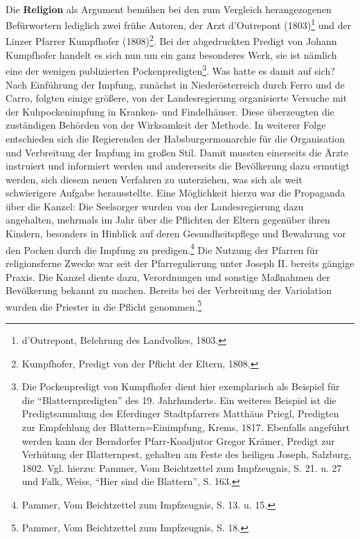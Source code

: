 \documentclass[
    a4paper,
    12pt,
    hyphens,
    chapterprefix=true,
    headheight=33pt,
    footheight=29pt,
    headings=optiontohead,
]{scrartcl}
\begin{document}
{\\
Die \textbf{Religion} als Argument bemühen bei den zum Vergleich herangezogenen Befürwortern lediglich zwei frühe Autoren, der Arzt d'Outrepont (1803)\footnote{d'Outrepont, Belehrung des Landvolkes, 1803.} und der Linzer Pfarrer Kumpfhofer (1808)\footnote{Kumpfhofer, Predigt von der Pflicht der Eltern, 1808.}. Bei der abgedruckten Predigt von Johann Kumpfhofer handelt es sich nun um ein ganz besonderes Werk, sie ist nämlich eine der wenigen publizierten Pockenpredigten\footnote{Die Pockenpredigt von Kumpfhofer dient hier exemplarisch als Beispiel für die "`Blatternpredigten"' des 19. Jahrhunderts. Ein weiteres Beispiel ist die Predigtsammlung des Eferdinger Stadtpfarrers Matthäus Priegl, Predigten zur Empfehlung der Blattern=Einimpfung, Krems, 1817. Ebenfalls angeführt werden kann der Berndorfer Pfarr-Koadjutor Gregor Krämer, Predigt zur Verhütung der Blatternpest, gehalten am Feste des heiligen Joseph, Salzburg, 1802. Vgl. hierzu: Pammer, Vom Beichtzettel zum Impfzeugnis, S. 21. u. 27 und Falk, Weiss, "`Hier sind die Blattern"', S. 163.}. Was hatte es damit auf sich? Nach Einführung der Impfung, zunächst in Niederösterreich durch Ferro und de Carro, folgten einige größere, von der Landesregierung organisierte Versuche mit der Kuhpockenimpfung in Kranken- und Findelhäuser. Diese überzeugten die zuständigen Behörden von der Wirksamkeit der Methode. In weiterer Folge entschieden sich die Regierenden der Habsburgermonarchie für die Organisation und Verbreitung der Impfung im großen Stil. Damit mussten einerseits die Ärzte instruiert und informiert werden und andererseits die Bevölkerung dazu ermutigt werden, sich diesem neuen Verfahren zu unterziehen, was sich als weit schwierigere Aufgabe herausstellte. Eine Möglichkeit hierzu war die Propaganda über die Kanzel: Die Seelsorger wurden von der Landesregierung dazu angehalten, mehrmals im Jahr über die Pflichten der Eltern gegenüber ihren Kindern, besonders in Hinblick auf deren Gesundheitspflege und Bewahrung vor den Pocken durch die Impfung zu predigen.\footnote{Pammer, Vom Beichtzettel zum Impfzeugnis, S. 13. u. 15.} Die Nutzung der Pfarren für religionsferne Zwecke war seit der Pfarregulierung unter Joseph II. bereits gängige Praxis. Die Kanzel diente dazu, Verordnungen und sonstige Maßnahmen der Bevölkerung bekannt zu machen. Bereits bei der Verbreitung der Variolation wurden die Priester in die Pflicht genommen.\footnote{Pammer, Vom Beichtzettel zum Impfzeugnis, S. 18.}\\
}
\end{document}
